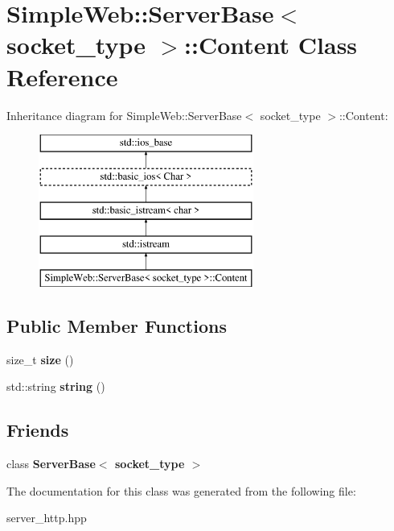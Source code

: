 \hypertarget{a01577}{}\section{Simple\+Web\+:\+:Server\+Base$<$ socket\+\_\+type $>$\+:\+:Content Class Reference}
\label{a01577}
Inheritance diagram for Simple\+Web\+:\+:Server\+Base$<$ socket\+\_\+type $>$\+:\+:Content\+:\begin{figure}[H]
\begin{center}
\leavevmode
\includegraphics[height=5.000000cm]{a01577}
\end{center}
\end{figure}
\subsection*{Public Member Functions}
\begin{DoxyCompactItemize}
\item 
\mbox{\label{a01577_adf8b2386c8ab32277341c6ae07cd4670}} 
size\+\_\+t {\bfseries size} ()
\item 
\mbox{\label{a01577_a6b4a72b0631c88ef576db28f54a768cb}} 
std\+::string {\bfseries string} ()
\end{DoxyCompactItemize}
\subsection*{Friends}
\begin{DoxyCompactItemize}
\item 
\mbox{\label{a01577_a01d54a7e16ca437c98ec571deca98dfc}} 
class {\bfseries Server\+Base$<$ socket\+\_\+type $>$}
\end{DoxyCompactItemize}


The documentation for this class was generated from the following file\+:\begin{DoxyCompactItemize}
\item 
server\+\_\+http.\+hpp\end{DoxyCompactItemize}
